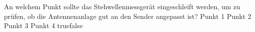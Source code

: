     {An welchem Punkt sollte das Stehwellenmessgerät eingeschleift werden, um zu prüfen, ob die Antennenanlage gut an den Sender angepasst ist? }
    {Punkt 1}
    {Punkt 2}
    {Punkt 3}
    {Punkt 4}
    {true}{false}
